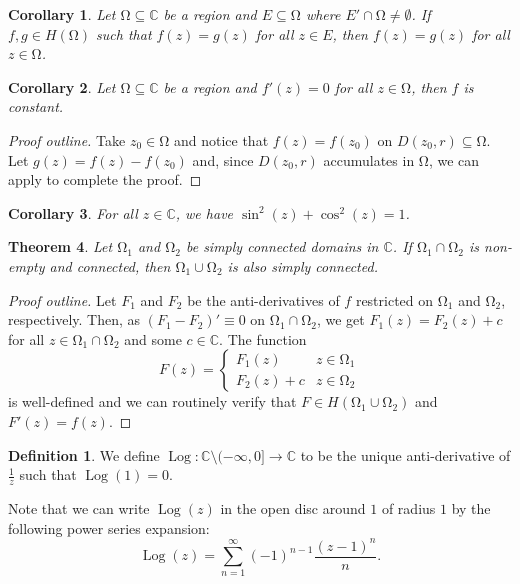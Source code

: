 \documentclass[letterpaper,12pt]{article}
\theoremstyle{definition}
\newtheorem{definition}{Definition}[section]
\theoremstyle{plain}
\newtheorem{thm}{Theorem}[section]
\newtheorem{corollary}[thm]{Corollary}
\theoremstyle{remark}
\newcommand{\C}{\mathbb{C}}
\let\oldOmega\Omega
\renewcommand{\Omega}{\mathrm{\oldOmega}}
\DeclareMathOperator\Log{Log}
\begin{document}
\begin{corollary}
Let $\Omega\subseteq \C$ be a region and $E\subseteq \Omega$ where $E'\cap \Omega\ne\emptyset$. If $f,g\in H(\Omega)$ such that $f(z)=g(z)$ for all $z\in E$, then $f(z)=g(z)$ for all $z\in \Omega$.
\end{corollary}

\begin{corollary}
Let $\Omega\subseteq \C$ be a region and $f'(z) = 0$ for all $z\in\Omega$, then $f$ is constant.
\end{corollary}

\begin{proof}[Proof outline]
Take $z_0\in \Omega$ and notice that $f(z)=f(z_0)$ on $D(z_0,r)\subseteq \Omega$. Let $g(z) = f(z)-f(z_0)$ and, since $D(z_0,r)$ accumulates in $\Omega$, we can apply  to complete the proof.
\end{proof}

\begin{corollary}
For all $z\in \C$, we have $\sin^2(z)+\cos^2(z) = 1$.
\end{corollary}

\begin{thm}
Let $\Omega_1$ and $\Omega_2$ be simply connected domains in $\C$. If $\Omega_1\cap \Omega_2$ is non-empty and connected, then $\Omega_1\cup\Omega_2$ is also simply connected.
\end{thm}

\begin{proof}[Proof outline]
Let $F_1$ and $F_2$ be the anti-derivatives of $f$ restricted on $\Omega_1$ and $\Omega_2$, respectively. Then, as $(F_1-F_2)'\equiv 0$ on $\Omega_1\cap \Omega_2$, we get $F_1(z) = F_2(z)+c$ for all $z\in \Omega_1\cap \Omega_2$ and some $c\in\C$. The function
\[F(z) = \begin{cases}
F_1(z) & z\in \Omega_1 \\
F_2(z)+c & z\in \Omega_2
\end{cases}\]
is well-defined and we can routinely verify that $F\in H(\Omega_1\cup \Omega_2)$ and $F'(z)=f(z)$.
\end{proof}

\begin{definition}
We define $\Log:\C\setminus(-\infty,0]\to \C$ to be the unique anti-derivative of $\frac1z$ such that $\Log(1)=0$.
\end{definition}

Note that we can write $\Log(z)$ in the open disc around $1$ of radius $1$ by the following power series expansion:
\[\Log(z) = \sum_{n=1}^\infty (-1)^{n-1}\frac{(z-1)^n}{n}.\]
\end{document}
